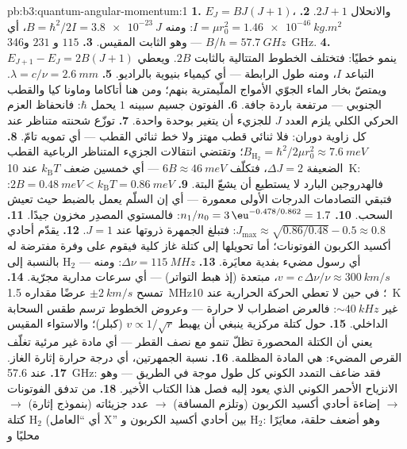 \begin{solution}{pb:b3:quantum-angular-momentum:1}
\textbf{1.} $E_J = BJ(J+1)$، والانحلال $2J + 1$.
\textbf{2.} $I = \mu r_0^2 = \qty{1.46e-46}{kg.m^2}$: ومنه $B =
\hbar^2/2I = \qty{3.8e-23}{J}$، أي $B/h = \qty{57.7}{GHz}$ ---
وهو الثابت المقيس.
\textbf{3.} $115$ و $231$ و\qty{346}{GHz}.
\textbf{4.} $E_{J+1} - E_J = 2B(J+1)$ ينمو خطيًا: فتختلف الخطوط
المتتالية بالثابت $2B$. ويعطي التباعد $I$، ومنه
طول الرابطة --- أي كيمياء بنيوية بالراديو.
\textbf{5.} $\lambda = c/\nu = \qty{2.6}{mm}$. ويمتصّ بخار الماء
الجوّي الأمواج الملّيمترية بنهم؛ ومن هنا أتاكاما وماونا كيا
والقطب الجنوبي --- مرتفعة باردة جافة.
\textbf{6.} الفوتون جسيم سبينه $1$ يحمل $\hbar$:
فانحفاظ العزم الحركي الكلي يلزم العدد $J$ للجزيء أن
يتغير بوحدة واحدة.
\textbf{7.} توزّع شحنته متناظر عند كل زاوية دوران:
فلا ثنائي قطب مهتز ولا خط ثنائي القطب --- أي تمويه
تامّ.
\textbf{8.} $B_{\text{H}_2} = \hbar^2/2\mu r_0^2 \approx
\qty{7.6}{meV}$؛ وتقتضي انتقالات الجزيء المتناظر الرباعية القطب
الضعيفة $\Delta J = 2$، فتكلّف $6B \approx
\qty{46}{meV}$ --- أي خمسين ضعف $k_{\text{B}}T$ عند \qty{10}{K}: فالهدروجين
البارد لا يستطيع أن يشعّ البتة.
\textbf{9.} $2B = \qty{0.48}{meV} < k_{\text{B}}T = \qty{0.86}{meV}$:
فتبقي التصادمات الدرجات الأولى معمورة --- أي إن السلّم يعمل
بالضبط حيث تعيش السحب.
\textbf{10.} $n_1/n_0 = 3\,\eu^{-0.478/0.862} = 1.7$: فالمستوي
المصدِر مخزون جيدًا.
\textbf{11.} $J_{\max} \approx \sqrt{0.86/0.48} - 0.5 \approx 0.8$:
فتبلغ الجمهرة ذروتها عند $J = 1$.
\textbf{12.} يقدّم أحادي أكسيد الكربون الفوتونات؛ أما تحويلها إلى كتلة
غاز كلية فيقوم على وفرة مفترضة له بالنسبة إلى H$_2$ --- أي رسول
مضيء بفدية معايَرة.
\textbf{13.} $\Delta\nu = \qty{115}{MHz}$: ومنه $v = c\,\Delta\nu/\nu
\approx \qty{300}{km/s}$، مبتعدة (إذ هبط التواتر) --- أي سرعات
مدارية مجرّية.
\textbf{14.} تمسح $\pm\qty{2}{km/s}$ عرضًا مقداره \qty{1.5}{MHz}؛ في حين
لا تعطي الحركة الحرارية عند \qty{10}{K} غير $\sim\qty{40}{kHz}$: فالعرض
اضطراب لا حرارة --- وعروض الخطوط ترسم طقس السحابة
الداخلي.
\textbf{15.} حول كتلة مركزية ينبغي أن يهبط $v \propto 1/\sqrt r$
(كبلر)؛ والاستواء المقيس يعني أن الكتلة المحصورة تظلّ
تنمو مع نصف القطر --- أي مادة غير مرئية تغلّف القرص
المضيء: هي المادة المظلمة.
\textbf{16.} نسبة الجمهرتين، أي درجة حرارة إثارة
الغاز.
\textbf{17.} عند \qty{57.6}{GHz}: فقد ضاعف التمدد الكوني كل طول
موجة في الطريق --- وهو الانزياح الأحمر الكوني الذي يعود إليه
فصل هذا الكتاب الأخير.
\textbf{18.} من تدفق الفوتونات $\to$ إضاءة أحادي أكسيد الكربون (وتلزم المسافة)
$\to$ عدد جزيئاته (بنموذج إثارة) $\to$ كتلة H$_2$ (أي
``العامل X'' بين أحادي أكسيد الكربون و H$_2$: وهو أضعف حلقة، معايَرًا محليًا و

\end{solution}
